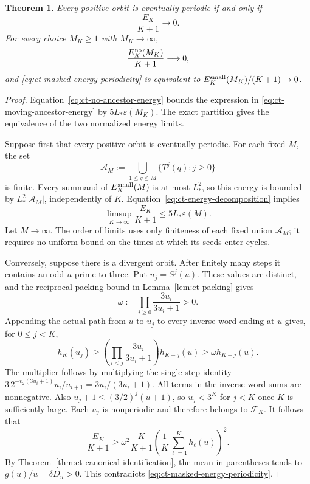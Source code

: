 \documentclass[11pt,a4paper]{article}
\newtheorem{theorem}{Theorem}
\begin{document}
\begin{theorem}\label{thm:ct-masked-energy-periodicity}
Every positive orbit is eventually periodic if and only if
\begin{equation}\label{eq:ct-masked-energy-periodicity}
 \frac{E_K}{K+1}\longrightarrow0.
\end{equation}
For every choice \(M_K\ge1\) with \(M_K\to\infty\),
\begin{equation}\label{eq:ct-moving-ancestor-energy}
 \frac{E_K^{\rm no}(M_K)}{K+1}\longrightarrow0,
\end{equation}
and \eqref{eq:ct-masked-energy-periodicity} is equivalent to
\(E_K^{\rm small}(M_K)/(K+1)\to0\).
\end{theorem}
\begin{proof}
Equation~\eqref{eq:ct-no-ancestor-energy} bounds the expression
in \eqref{eq:ct-moving-ancestor-energy} by
\(5L_*\varepsilon(M_K)\). The exact partition gives the
equivalence of the two normalized energy limits.

Suppose first that every positive orbit is eventually periodic.
For each fixed \(M\), the set
\[
 \mathcal A_M:=\bigcup_{1\le q\le M}\{T^j(q):j\ge0\}
\]
is finite. Every summand of \(E_K^{\rm small}(M)\) is at most
\(L_*^2\), so this energy is bounded by
\(L_*^2|\mathcal A_M|\), independently of \(K\).
Equation~\eqref{eq:ct-energy-decomposition} implies
\[
 \limsup_{K\to\infty}\frac{E_K}{K+1}
       \le5L_*\varepsilon(M).
\]
Let \(M\to\infty\). The order of limits uses only finiteness
of each fixed union \(\mathcal A_M\); it requires no uniform
bound on the times at which its seeds enter cycles.

Conversely, suppose there is a divergent orbit. After finitely
many steps it contains an odd \(u\) prime to three. Put
\(u_j=S^j(u)\). These values are distinct, and the reciprocal
packing bound in Lemma~\ref{lem:ct-packing} gives
\[
 \omega:=\prod_{i\ge0}\frac{3u_i}{3u_i+1}>0.
\]
Appending the actual path from \(u\) to \(u_j\) to every
inverse word ending at \(u\) gives, for \(0\le j<K\),
\[
 h_K(u_j)\ge
 \left(\prod_{i<j}\frac{3u_i}{3u_i+1}\right)h_{K-j}(u)
 \ge\omega h_{K-j}(u).
\]
The multiplier follows by multiplying the single-step identity
\(3\,2^{-v_2(3u_i+1)}u_i/u_{i+1}=3u_i/(3u_i+1)\).
All terms in the inverse-word sums are nonnegative.
Also \(u_j+1\le(3/2)^j(u+1)\), so \(u_j<3^K\) for
\(j<K\) once \(K\) is sufficiently large. Each \(u_j\) is
nonperiodic and therefore belongs to \(\mathcal F_K\).
It follows that
\[
 \frac{E_K}{K+1}\ge
 \omega^2\frac{K}{K+1}
       \left(\frac1K\sum_{\ell=1}^K h_\ell(u)\right)^2.
\]
By Theorem~\ref{thm:ct-canonical-identification}, the mean in
parentheses tends to \(g(u)/u=\delta D_u>0\).
This contradicts \eqref{eq:ct-masked-energy-periodicity}.
\end{proof}
\end{document}
